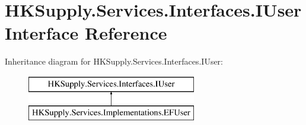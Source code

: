 \hypertarget{interface_h_k_supply_1_1_services_1_1_interfaces_1_1_i_user}{}\section{H\+K\+Supply.\+Services.\+Interfaces.\+I\+User Interface Reference}
\label{interface_h_k_supply_1_1_services_1_1_interfaces_1_1_i_user}
Inheritance diagram for H\+K\+Supply.\+Services.\+Interfaces.\+I\+User\+:\begin{figure}[H]
\begin{center}
\leavevmode
\includegraphics[height=2.000000cm]{interface_h_k_supply_1_1_services_1_1_interfaces_1_1_i_user}
\end{center}
\end{figure}
